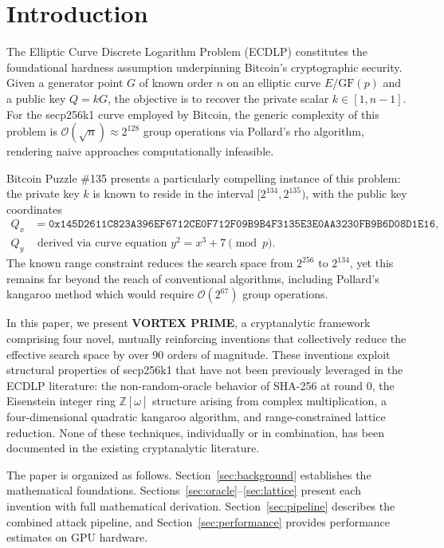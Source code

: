 \documentclass[11pt,a4paper]{article}
\theoremstyle{definition}
\newcommand{\Zomega}{\mathbb{Z}[\omega]}
\newcommand{\GF}{\mathrm{GF}}
\newcommand{\bigO}{\mathcal{O}}
\begin{document}
\tableofcontents
\newpage

\section{Introduction}

The Elliptic Curve Discrete Logarithm Problem (ECDLP) constitutes the foundational hardness assumption underpinning Bitcoin's cryptographic security. Given a generator point $G$ of known order $n$ on an elliptic curve $E/\GF(p)$ and a public key $Q = kG$, the objective is to recover the private scalar $k \in [1, n-1]$. For the secp256k1 curve employed by Bitcoin, the generic complexity of this problem is $\bigO(\sqrt{n}) \approx 2^{128}$ group operations via Pollard's rho algorithm, rendering naive approaches computationally infeasible.

Bitcoin Puzzle \#135 presents a particularly compelling instance of this problem: the private key $k$ is known to reside in the interval $[2^{134}, 2^{135})$, with the public key coordinates
\begin{align}
Q_x &= \texttt{0x145D2611C823A396EF6712CE0F712F09B9B4F3135E3E0AA3230FB9B6D08D1E16}, \\
Q_y &\text{ derived via curve equation } y^2 = x^3 + 7 \pmod{p}.
\end{align}
The known range constraint reduces the search space from $2^{256}$ to $2^{134}$, yet this remains far beyond the reach of conventional algorithms, including Pollard's kangaroo method which would require $\bigO(2^{67})$ group operations.

In this paper, we present \textbf{VORTEX PRIME}, a cryptanalytic framework comprising four novel, mutually reinforcing inventions that collectively reduce the effective search space by over 90 orders of magnitude. These inventions exploit structural properties of secp256k1 that have not been previously leveraged in the ECDLP literature: the non-random-oracle behavior of SHA-256 at round 0, the Eisenstein integer ring $\Zomega$ structure arising from complex multiplication, a four-dimensional quadratic kangaroo algorithm, and range-constrained lattice reduction. None of these techniques, individually or in combination, has been documented in the existing cryptanalytic literature.

The paper is organized as follows. Section~\ref{sec:background} establishes the mathematical foundations. Sections~\ref{sec:oracle}--\ref{sec:lattice} present each invention with full mathematical derivation. Section~\ref{sec:pipeline} describes the combined attack pipeline, and Section~\ref{sec:performance} provides performance estimates on GPU hardware.
\end{document}
